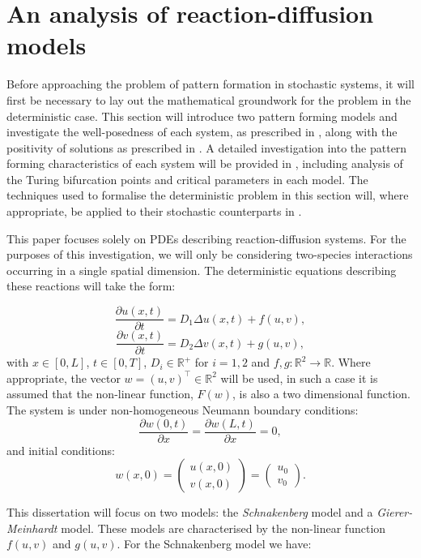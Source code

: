 \documentclass[12pt]{article}
\begin{document}
\section{An analysis of reaction-diffusion models}
Before approaching the problem of pattern formation in stochastic systems, it will first be necessary to lay out the mathematical groundwork for the problem in the deterministic case. This section will introduce two pattern forming models and investigate the well-posedness of each system, as prescribed in \cite{Lord}, along with the positivity of solutions as prescribed in \cite{Smoller}. A detailed investigation into the pattern forming characteristics of each system will be provided in , including analysis of the Turing bifurcation points and critical parameters in each model. The techniques used to formalise the deterministic problem in this section will, where appropriate, be applied to their stochastic counterparts in . 


This paper focuses solely on PDEs describing reaction-diffusion systems. For the purposes of this investigation, we will only be considering two-species interactions occurring in a single spatial dimension. The deterministic equations describing these reactions will take the form:

\begin{equation} \label{dpde1}
\frac{\partial u(x,t)}{\partial t} = D_1\Delta u(x,t) + f(u,v),
\end{equation}
\begin{equation} \label{dpde2}
\frac{\partial v(x,t)}{\partial t} = D_2\Delta v(x,t) + g(u,v),
\end{equation}
with $ x \in [0,L]$, $ t \in [0,T]$, $D_i \in \mathbb{R}^+$ for $i = 1,2$ and $f,g:\mathbb{R}^2\rightarrow\mathbb{R}$. Where appropriate, the vector $w = (u,v)^\intercal \in \mathbb{R}^2$ will be used, in such a case it is assumed that the non-linear function, $F(w)$, is also a two dimensional function.  The system is under non-homogeneous Neumann boundary conditions: 
$$
\frac{\partial{w(0,t)}}{\partial{x}} = \frac{\partial{w}(L,t)}{\partial{x}} = 0,$$
and initial conditions:
$$
w(x,0) = 
\begin{pmatrix}
u(x,0)\\
v(x,0)
\end{pmatrix}
=
\begin{pmatrix}
u_0\\
v_0
\end{pmatrix}.
$$

This dissertation will focus on two models: the \textit{Schnakenberg} model and a \textit{Gierer-Meinhardt} model. These models are characterised by the non-linear function $f(u,v)$ and $g(u,v)$. For the Schnakenberg model \cite{Schnakenberg} we have:
\end{document}
